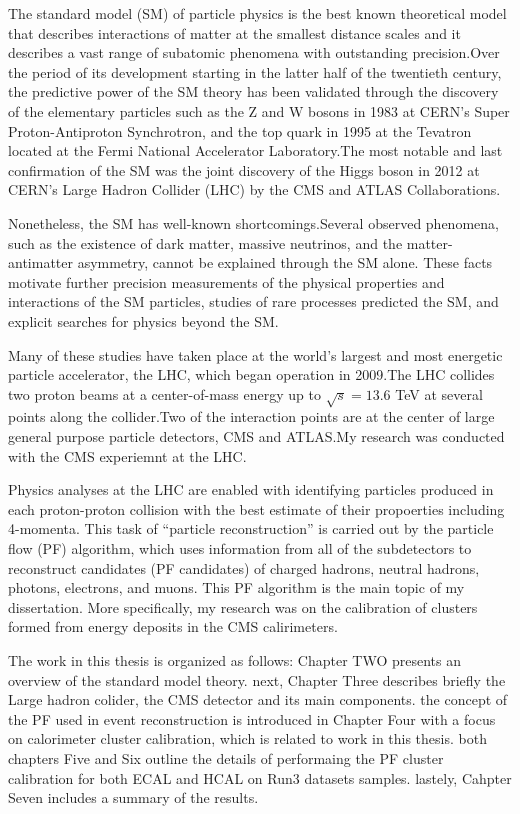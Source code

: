 
The standard model (SM) of particle physics %
is the best known theoretical model that describes interactions of matter at the smallest %
distance scales and it describes a vast range of subatomic phenomena with outstanding precision.Over the period of its development starting in the latter half of the twentieth century, the predictive power of the SM theory has been validated through the discovery of the elementary particles such as the Z and W bosons in 1983 at CERN's Super Proton-Antiproton Synchrotron, and the top quark in 1995 at the Tevatron located at the Fermi National Accelerator Laboratory.The most notable and last confirmation of the SM was the joint discovery of the Higgs boson in 2012 at CERN's Large Hadron Collider (LHC) by the CMS and ATLAS Collaborations.

Nonetheless, the SM has well-known shortcomings.Several observed phenomena, such as the existence of dark matter, massive neutrinos, and the matter-antimatter asymmetry, cannot be explained through the SM alone.
These facts motivate further precision measurements of the physical properties and interactions of the SM particles, studies of rare processes predicted the SM, and explicit searches for physics beyond the SM.

Many of these studies have taken place at the world's largest and most energetic particle accelerator, the LHC, which began operation in 2009.The LHC collides two proton beams at a center-of-mass energy up to $\sqrt{s}=13.6$ TeV at several points along the collider.Two of the interaction points are at the center of large general purpose particle detectors, CMS and ATLAS.My research was conducted with the CMS experiemnt at the LHC.

Physics analyses at the LHC are enabled with identifying particles produced in each proton-proton collision with the best estimate of their propoerties including 4-momenta.
This task of ``particle reconstruction'' is carried out by the particle flow (PF) algorithm, which uses information from all of the subdetectors
to reconstruct candidates (PF candidates) of charged hadrons, neutral hadrons, photons, electrons, and muons.
This PF algorithm is the main topic of my dissertation.
More specifically, my research was on the calibration of clusters formed from energy deposits in the CMS calirimeters.


The work in this thesis is organized as follows:
Chapter TWO presents an overview of the standard model theory. 
next, Chapter Three describes briefly the Large hadron colider, the CMS detector and its main components. 
the concept of the PF used in event reconstruction is introduced in Chapter Four with a focus on calorimeter cluster calibration, which is related to work in this thesis. 
both chapters Five and Six outline the details of performaing the PF cluster calibration for both ECAL and HCAL on Run3 datasets samples. 
lastely, Cahpter Seven includes a summary of the results. 
